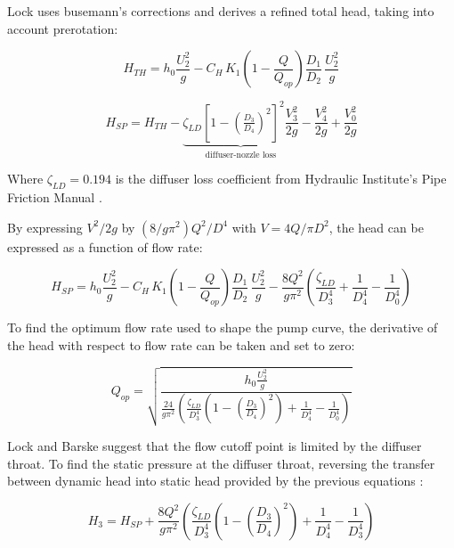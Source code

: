 Lock uses busemann's corrections and derives a refined total head, taking into account prerotation:

\begin{equation}
    H_{TH} = h_0\frac{U_2^2}{g} - C_H\,K_1\!\left(1-\frac{Q}{Q_{op}}\right)\!\frac{D_1}{D_2}\,\frac{U_2^2}{g}
\end{equation}

\begin{equation}
H_{SP} = H_{TH} - \underbrace{\zeta_{LD}\left[1-\left(\tfrac{D_3}{D_4}\right)^2\right]^2\frac{V_3^2}{2g}}_{\text{diffuser-nozzle loss}} - \frac{V_4^2}{2g} + \frac{V_0^2}{2g}
\end{equation}

Where $\zeta_{LD}=0.194$ is the diffuser loss coefficient from Hydraulic Institute's Pipe Friction Manual \cite{hydraulicpipemanual}.

By expressing $V^2/2g$ by $(8/g\pi^2)Q^2/D^4$ with $V=4Q/\pi D^2$, the head can be expressed as a function of flow rate:

\begin{equation}
    H_{SP} = h_0\frac{U_2^2}{g} - C_H\,K_1\!\left(1-\frac{Q}{Q_{op}}\right)\!\frac{D_1}{D_2}\,\frac{U_2^2}{g} - \frac{8Q^2}{g\pi^2}\left(\frac{\zeta_{LD}}{D_3^4} + \frac{1}{D_4^4} - \frac{1}{D_0^4}\right)
\end{equation}

To find the optimum flow rate used to shape the pump curve, the derivative of the head with respect to flow rate can be taken and set to zero:

\begin{equation}
    Q_{op} = \sqrt{\frac{h_0\frac{U_2^2}{g}}{\frac{24}{g\pi^2}\left(\frac{\zeta_{LD}}{D_3^4}\left(1-\left(\tfrac{D_3}{D_4}\right)^2\right) + \frac{1}{D_4^4} - \frac{1}{D_0^4}\right)}}
    \label{eq:lock_optimum_flow}
\end{equation}

Lock and Barske suggest that the flow cutoff point is limited by the diffuser throat. To find the static pressure at the diffuser throat, reversing the transfer between dynamic head into static head provided by the previous equations :

\begin{equation}
    H_3 = H_{SP} + \frac{8Q^2}{g\pi^2}\left(\frac{\zeta_{LD}}{D_3^4}\left(1-\left(\frac{D_3}{D_4}\right)^2\right) + \frac{1}{D_4^4} - \frac{1}{D_3^4}\right)
\end{equation}

